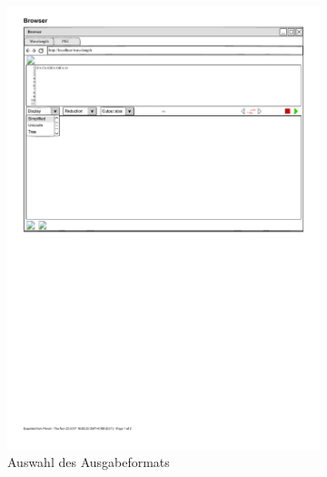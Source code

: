 \documentclass[parskip=full,11pt,twoside]{scrartcl}
\begin{document}
{\begin{figure}[H]
	\begin{subfigure}[l]{0.25\textwidth}
	\centering
		\includegraphics{img/displayMenu}
	\caption{\label{fig:display}Auswahl des Ausgabeformats}	
	\end{subfigure}
	\hspace*{\fill}
	\begin{subfigure}[m]{0.25\textwidth}
	\centering

\end{subfigure}
\end{figure}}
\end{document}
